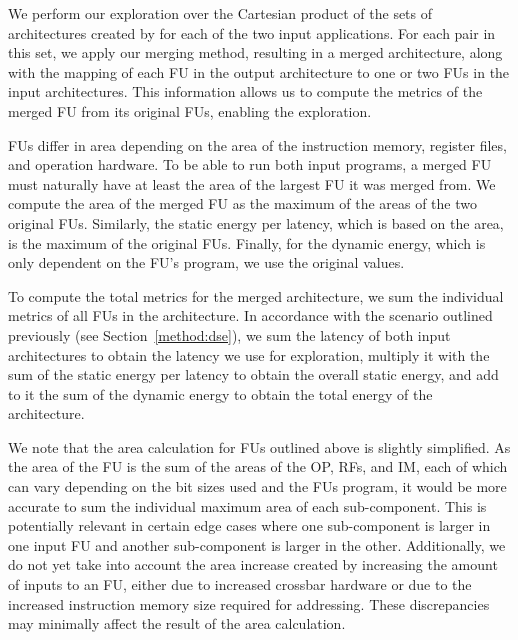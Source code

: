 We perform our exploration over the Cartesian product of the sets of architectures created by \microgenie for each of the two input applications. For each pair in this set, we apply our merging method, resulting in a merged architecture, along with the mapping of each FU in the output architecture to one or two FUs in the input architectures. This information allows us to compute the metrics of the merged FU from its original FUs, enabling the exploration.

FUs differ in area depending on the area of the instruction memory, register files, and operation hardware. To be able to run both input programs, a merged FU must naturally have at least the area of the largest FU it was merged from. We compute the area of the merged FU as the maximum of the areas of the two original FUs. Similarly, the static energy per latency, which is based on the area, is the maximum of the original FUs. Finally, for the dynamic energy, which is only dependent on the FU's program, we use the original values.

To compute the total metrics for the merged architecture, we sum the individual metrics of all FUs in the architecture. In accordance with the scenario outlined previously (see Section~\ref{method:dse}), we sum the latency of both input architectures to obtain the latency we use for exploration, multiply it with the sum of the static energy per latency to obtain the overall static energy, and add to it the sum of the dynamic energy to obtain the total energy of the architecture.

We note that the area calculation for FUs outlined above is slightly simplified. As the area of the FU is the sum of the areas of the OP, RFs, and IM, each of which can vary depending on the bit sizes used and the FUs program, it would be more accurate to sum the individual maximum area of each sub-component. This is potentially relevant in certain edge cases where one sub-component is larger in one input FU and another sub-component is larger in the other. Additionally, we do not yet take into account the area increase created by increasing the amount of inputs to an FU, either due to increased crossbar hardware or due to the increased instruction memory size required for addressing. These discrepancies may minimally affect the result of the area calculation.

